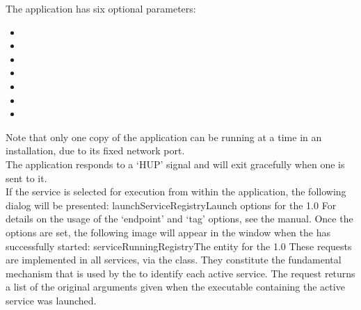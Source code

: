 The application has six optional parameters:
\begin{itemize}
\item{}
\item\exSp{}
\item{}
\item\exSp{}
\item\exSp{}
\item\exSp{}
\item\exSp{}
\end{itemize}
Note that only one copy of the  application can be
running at a time in an \mplusm{} installation, due to its fixed \yarp{} network port.\\

The  application responds to a `HUP' signal and will
exit gracefully when one is sent to it.\\

If the service is selected for execution from within the \emph{\MMMU} application, the
following dialog will be presented:
%
{launchServiceRegistry}{Launch options for the }{1.0}
\condPage{}
For details on the usage of the `endpoint' and `tag' options, see the \emph{\MMMU} manual.
Once the options are set, the following image will appear in the \emph{\MMMU} window when
the  has successfully started:
%
{serviceRunningRegistry}{The \emph{\MMMU} entity for the
}{1.0}
\secondaryEnd
{}
These requests are implemented in all \mplusm{} services, via the
 class.
They constitute the fundamental mechanism that is used by the
 to identify each active service.
The  request returns a list of the original
arguments given when the executable containing the active service was launched.\\

